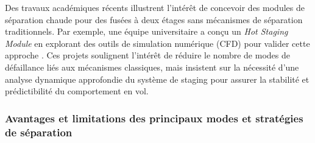 Des travaux académiques récents illustrent l’intérêt de concevoir des modules de séparation chaude pour des fusées à deux étages
sans mécanismes de séparation traditionnels. Par exemple, une équipe universitaire a conçu un \textit{\og{}Hot Staging
Module\fg{}} en explorant des outils de simulation numérique (CFD) pour valider cette approche
\cite{Whitman_2025_HotStagingModule}. Ces projets soulignent l’intérêt de réduire le nombre de modes de défaillance liés aux
mécanismes classiques, mais insistent sur la nécessité d’une analyse dynamique approfondie du système de staging pour assurer la
stabilité et prédictibilité du comportement en vol.

\newpage

\subsubsection{Avantages et limitations des principaux modes et stratégies de séparation}

